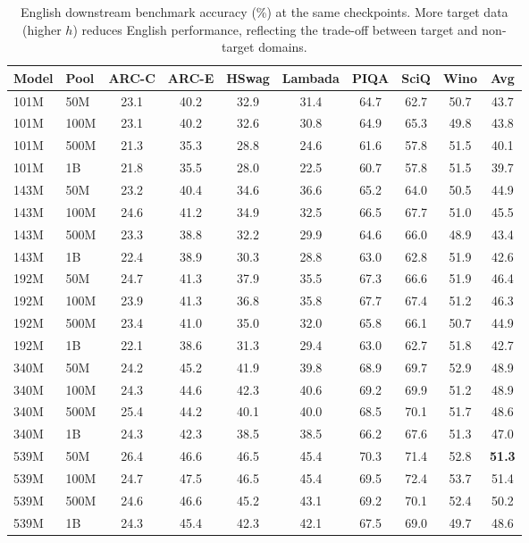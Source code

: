 \begin{table}[h]
\centering
\caption{English downstream benchmark accuracy (\%) at the same checkpoints. More target data (higher $h$) reduces English performance, reflecting the trade-off between target and non-target domains.}
\label{tab:downstream_en}
\begin{tabular}{ll ccccccc c}
\toprule
Model & Pool & ARC-C & ARC-E & HSwag & Lambada & PIQA & SciQ & Wino & \textbf{Avg} \\
\midrule
101M & 50M  & 23.1 & 40.2 & 32.9 & 31.4 & 64.7 & 62.7 & 50.7 & 43.7 \\
101M & 100M & 23.1 & 40.2 & 32.6 & 30.8 & 64.9 & 65.3 & 49.8 & 43.8 \\
101M & 500M & 21.3 & 35.3 & 28.8 & 24.6 & 61.6 & 57.8 & 51.5 & 40.1 \\
101M & 1B   & 21.8 & 35.5 & 28.0 & 22.5 & 60.7 & 57.8 & 51.5 & 39.7 \\
\midrule
143M & 50M  & 23.2 & 40.4 & 34.6 & 36.6 & 65.2 & 64.0 & 50.5 & 44.9 \\
143M & 100M & 24.6 & 41.2 & 34.9 & 32.5 & 66.5 & 67.7 & 51.0 & 45.5 \\
143M & 500M & 23.3 & 38.8 & 32.2 & 29.9 & 64.6 & 66.0 & 48.9 & 43.4 \\
143M & 1B   & 22.4 & 38.9 & 30.3 & 28.8 & 63.0 & 62.8 & 51.9 & 42.6 \\
\midrule
192M & 50M  & 24.7 & 41.3 & 37.9 & 35.5 & 67.3 & 66.6 & 51.9 & 46.4 \\
192M & 100M & 23.9 & 41.3 & 36.8 & 35.8 & 67.7 & 67.4 & 51.2 & 46.3 \\
192M & 500M & 23.4 & 41.0 & 35.0 & 32.0 & 65.8 & 66.1 & 50.7 & 44.9 \\
192M & 1B   & 22.1 & 38.6 & 31.3 & 29.4 & 63.0 & 62.7 & 51.8 & 42.7 \\
\midrule
340M & 50M  & 24.2 & 45.2 & 41.9 & 39.8 & 68.9 & 69.7 & 52.9 & 48.9 \\
340M & 100M & 24.3 & 44.6 & 42.3 & 40.6 & 69.2 & 69.9 & 51.2 & 48.9 \\
340M & 500M & 25.4 & 44.2 & 40.1 & 40.0 & 68.5 & 70.1 & 51.7 & 48.6 \\
340M & 1B   & 24.3 & 42.3 & 38.5 & 38.5 & 66.2 & 67.6 & 51.3 & 47.0 \\
\midrule
539M & 50M  & 26.4 & 46.6 & 46.5 & 45.4 & 70.3 & 71.4 & 52.8 & \textbf{51.3} \\
539M & 100M & 24.7 & 47.5 & 46.5 & 45.4 & 69.5 & 72.4 & 53.7 & 51.4 \\
539M & 500M & 24.6 & 46.6 & 45.2 & 43.1 & 69.2 & 70.1 & 52.4 & 50.2 \\
539M & 1B   & 24.3 & 45.4 & 42.3 & 42.1 & 67.5 & 69.0 & 49.7 & 48.6 \\
\bottomrule
\end{tabular}
\end{table}


